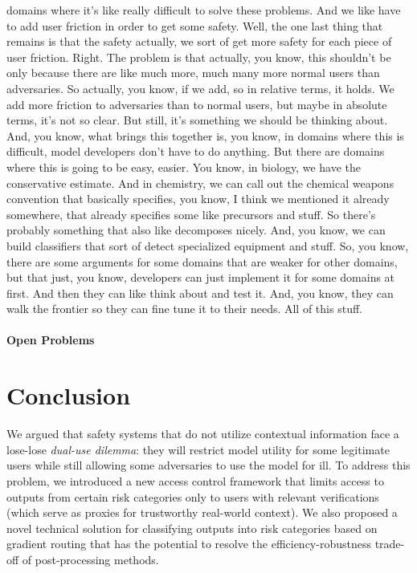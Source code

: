 \documentclass{article}
\theoremstyle{plain}
\theoremstyle{definition}
\theoremstyle{remark}
\begin{document}
domains where it's like really difficult to solve these problems. And we like have to add user friction in order to get some safety. Well, the one last thing that remains is that the safety actually, we sort of get more safety for each piece of user friction. Right. The problem is that actually, you know, this shouldn't be only because there are like much more, much many more normal users than adversaries. So actually, you know, if we add, so in relative terms, it holds. We add more friction to adversaries than to normal users, but maybe in absolute terms, it's not so clear. But still, it's something we should be thinking about. And, you know, what brings this together is, you know, in domains where this is difficult, model developers don't have to do anything. But there are domains where this is going to be easy, easier. You know, in biology, we have the conservative estimate. And in chemistry, we can call out the chemical weapons convention that basically specifies, you know, I think we mentioned it already somewhere, that already specifies some like precursors and stuff. So there's probably something that also like decomposes nicely. And, you know, we can build classifiers that sort of detect specialized equipment and stuff. So, you know, there are some arguments for some domains that are weaker for other domains, but that just, you know, developers can just implement it for some domains at first. And then they can like think about and test it. And, you know, they can walk the frontier so they can fine tune it to their needs. All of this stuff.

\paragraph{Open Problems}

\section{Conclusion}

We argued that safety systems that do not utilize contextual
information face a lose-lose \emph{dual-use dilemma}: they will
restrict model utility for some legitimate users while still allowing
some adversaries to use the model for ill. To address this problem,
we introduced a new access control framework that limits access to
outputs from certain risk categories only to users with relevant
verifications (which serve as proxies for trustworthy real-world
context). We also proposed a novel technical solution for classifying
outputs into risk categories based on gradient routing that has the
potential to resolve the efficiency-robustness trade-off of
post-processing methods.
\end{document}
